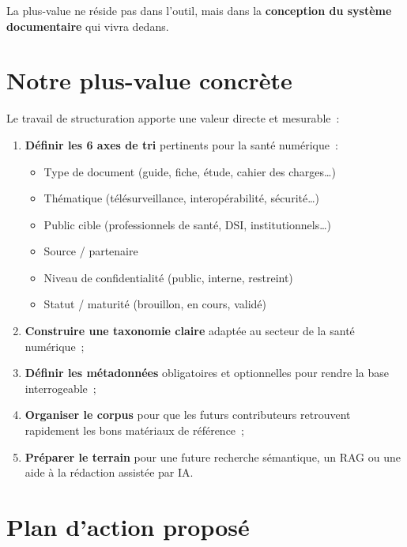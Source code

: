 \documentclass[12pt, a4paper]{article}
\begin{document}
La plus-value ne réside pas dans l'outil, mais dans la \textbf{conception du système documentaire} qui vivra dedans.

\section{Notre plus-value concrète}

Le travail de structuration apporte une valeur directe et mesurable~:

\begin{enumerate}[leftmargin=1.5em]
  \item \textbf{Définir les 6 axes de tri} pertinents pour la santé numérique~:
    \begin{itemize}[leftmargin=1em]
      \item Type de document (guide, fiche, étude, cahier des charges\ldots)
      \item Thématique (télésurveillance, interopérabilité, sécurité\ldots)
      \item Public cible (professionnels de santé, DSI, institutionnels\ldots)
      \item Source / partenaire
      \item Niveau de confidentialité (public, interne, restreint)
      \item Statut / maturité (brouillon, en cours, validé)
    \end{itemize}
  \item \textbf{Construire une taxonomie claire} adaptée au secteur de la santé numérique~;
  \item \textbf{Définir les métadonnées} obligatoires et optionnelles pour rendre la base interrogeable~;
  \item \textbf{Organiser le corpus} pour que les futurs contributeurs retrouvent rapidement les bons matériaux de référence~;
  \item \textbf{Préparer le terrain} pour une future recherche sémantique, un RAG ou une aide à la rédaction assistée par IA.
\end{enumerate}

\section{Plan d'action proposé}
\end{document}
